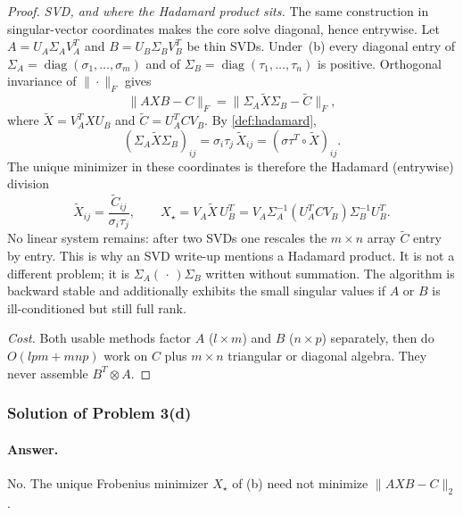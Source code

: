 \documentclass[11pt,a4paper]{article}
\begin{document}
\begin{proof}
\emph{SVD, and where the Hadamard product sits.}
The same construction in singular-vector coordinates makes the core solve diagonal, hence entrywise. Let \(A=U_{A}\Sigma_{A}V_{A}^{T}\) and \(B=U_{B}\Sigma_{B}V_{B}^{T}\) be thin SVDs. Under~(b) every diagonal entry of \(\Sigma_{A}=\operatorname{diag}(\sigma_{1},\ldots,\sigma_{m})\) and of \(\Sigma_{B}=\operatorname{diag}(\tau_{1},\ldots,\tau_{n})\) is positive. Orthogonal invariance of \(\|\cdot\|_{F}\) gives
\[
\|AXB-C\|_{F}
=
\bigl\|\Sigma_{A}\tilde{X}\Sigma_{B}-\tilde{C}\bigr\|_{F},
\]
where \(\tilde{X}=V_{A}^{T}XU_{B}\) and \(\tilde{C}=U_{A}^{T}CV_{B}\). By \cref{def:hadamard},
\[
(\Sigma_{A}\tilde{X}\Sigma_{B})_{ij}
=
\sigma_{i}\tau_{j}\,\tilde{X}_{ij}
=
(\sigma\tau^{T}\circ\tilde{X})_{ij}.
\]
The unique minimizer in these coordinates is therefore the Hadamard (entrywise) division
\[
\tilde{X}_{ij}
=
\frac{\tilde{C}_{ij}}{\sigma_{i}\tau_{j}},
\qquad
X_{\star}
=
V_{A}\tilde{X}\,U_{B}^{T}
=
V_{A}\Sigma_{A}^{-1}(U_{A}^{T}CV_{B})\Sigma_{B}^{-1}U_{B}^{T}.
\]
No linear system remains: after two SVDs one rescales the \(m\times n\) array \(\tilde{C}\) entry by entry. This is why an SVD write-up mentions a Hadamard product. It is not a different problem; it is \(\Sigma_{A}(\,\cdot\,)\Sigma_{B}\) written without summation. The algorithm is backward stable and additionally exhibits the small singular values if \(A\) or \(B\) is ill-conditioned but still full rank.

\emph{Cost.}
Both usable methods factor \(A\) (\(l\times m\)) and \(B\) (\(n\times p\)) separately, then do \(O(lpm+mnp)\) work on \(C\) plus \(m\times n\) triangular or diagonal algebra. They never assemble \(B^{T}\otimes A\).
\end{proof}

\subsubsection{Solution of Problem 3(d)}

\paragraph{Answer.}
No. The unique Frobenius minimizer \(X_{\star}\) of (b) need not minimize \(\|AXB-C\|_{2}\).
\end{document}
